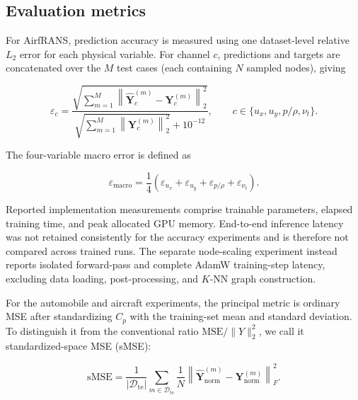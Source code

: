 \documentclass[a4paper,fleqn]{cas-sc}
\begin{document}
\subsection{Evaluation metrics}
\label{subsec:evaluation_metrics}

For AirfRANS, prediction accuracy is measured using one dataset-level relative
\(L_2\) error for each physical variable. For channel \(c\), predictions and
targets are concatenated over the \(M\) test cases (each containing \(N\)
sampled nodes), giving

\begin{equation}
    \varepsilon_c
    =
    \frac{
        \sqrt{\displaystyle\sum_{m=1}^{M}
        \left\|\widehat{\mathbf Y}^{(m)}_c-\mathbf Y^{(m)}_c\right\|_2^2}
    }{
        \sqrt{\displaystyle\sum_{m=1}^{M}
        \left\|\mathbf Y^{(m)}_c\right\|_2^2}+10^{-12}
    },
    \qquad
    c\in\{u_x,u_y,p/\rho,\nu_t\}.
    \label{eq:relative_l2_metric}
\end{equation}

The four-variable macro error is defined as

\begin{equation}
    \varepsilon_{\mathrm{macro}}
    =
    \frac{1}{4}
    \left(
        \varepsilon_{u_x}
        +
        \varepsilon_{u_y}
        +
        \varepsilon_{p/\rho}
        +
        \varepsilon_{\nu_t}
    \right).
    \label{eq:macro_error}
\end{equation}

Reported implementation measurements
comprise trainable parameters, elapsed training time, and peak allocated GPU
memory. End-to-end inference latency was not retained consistently for the
accuracy experiments and is therefore not compared across trained runs.
The separate node-scaling experiment instead reports isolated forward-pass
and complete AdamW training-step latency, excluding data loading,
post-processing, and \(K\)-NN graph construction.

For the automobile and aircraft experiments, the principal metric is ordinary
MSE after standardizing \(C_p\) with the training-set mean and standard
deviation. To distinguish it from the conventional ratio
\(\mathrm{MSE}/\|Y\|_2^2\), we call it standardized-space MSE (sMSE):

\begin{equation}
    \mathrm{sMSE}
    =
    \frac{1}{|\mathcal D_{\mathrm{te}}|}
    \sum_{m\in\mathcal D_{\mathrm{te}}}
    \frac{1}{N}
    \left\|
        \widehat{\mathbf Y}^{(m)}_{\mathrm{norm}}
        -
        \mathbf Y^{(m)}_{\mathrm{norm}}
    \right\|_F^2 .
    \label{eq:surface_standardized_mse}
\end{equation}
\end{document}

